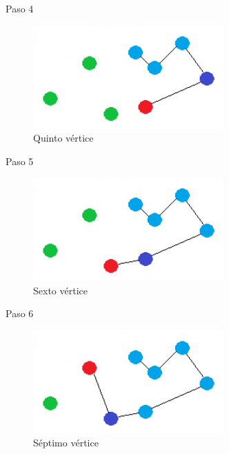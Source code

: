 \begin{frame}
	\begin{exampleblock}{Paso 4}
	\begin{figure}[htbH]
		\centering
		\includegraphics[width=0.65\textwidth]{./Imagenes/vecino4.png}
		\caption{Quinto vértice}
	\end{figure}
	\end{exampleblock}
\end{frame}


\begin{frame}
	\begin{exampleblock}{Paso 5}
	\begin{figure}[htbH]
		\centering
		\includegraphics[width=0.65\textwidth]{./Imagenes/vecino5.png}
		\caption{Sexto vértice}
	\end{figure}
	\end{exampleblock}
\end{frame}

\begin{frame}
	\begin{exampleblock}{Paso 6}
	\begin{figure}[htbH]
		\centering
		\includegraphics[width=0.65\textwidth]{./Imagenes/vecino6.png}
		\caption{Séptimo vértice}
	\end{figure}
	\end{exampleblock}
\end{frame}



